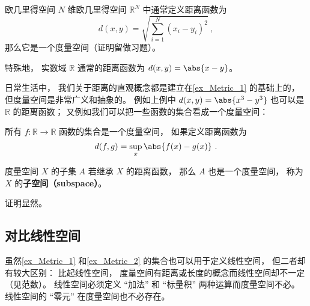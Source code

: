 \begin{example}{欧几里得空间}\label{ex_Metric_1}
$N$ 维欧几里得空间 $\mathbb R^N$ 中通常定义距离函数为
\begin{equation}\label{eq_Metric_1}
d(x, y) = \sqrt{\sum_{i=1}^N (x_i - y_i)^2}~,
\end{equation}
那么它是一个度量空间（证明留做习题）。

特殊地， 实数域 $\mathbb R$ 通常的距离函数为 $d(x, y) = \abs{x - y}$。
\end{example}

日常生活中， 我们关于距离的直观概念都是建立在\autoref{ex_Metric_1} 的基础上的， 但度量空间是非常广义和抽象的。 例如上例中 $d(x, y) = \abs{x^3 - y^3}$ 也可以是 $\mathbb R$ 的距离函数； 又例如我们可以把一些函数的集合看成一个度量空间：
\begin{example}{}\label{ex_Metric_2}
所有 $f:\mathbb R \to \mathbb R$ 函数的集合是一个度量空间， 如果定义距离函数为
\begin{equation}
d(f, g) = \sup_x{\abs{f(x) - g(x)}}~.
\end{equation}

\end{example}

\begin{corollary}{}
度量空间 $X$ 的子集 $A$ 若继承 $X$ 的距离函数， 那么 $A$ 也是一个度量空间， 称为 $X$ 的\textbf{子空间（subspace）}。
\end{corollary}
证明显然。

\subsection{对比线性空间}
虽然\autoref{ex_Metric_1} 和\autoref{ex_Metric_2} 的集合也可以用于定义线性空间， 但二者却有较大区别： 比起线性空间， 度量空间有距离或长度的概念而线性空间却不一定（见范数）。 线性空间必须定义 “加法” 和 “标量积” 两种运算而度量空间不必。 线性空间的 “零元” 在度量空间也不必存在。
